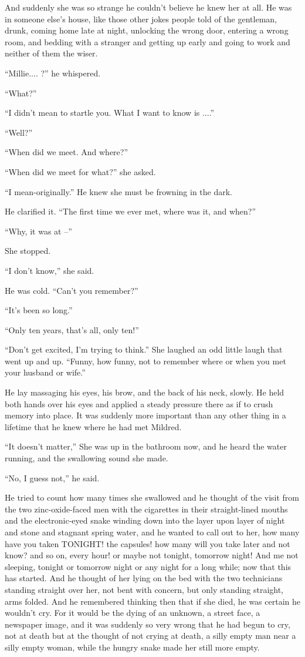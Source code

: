 \documentclass[11pt,openany]{book}
\begin{document}
And suddenly she was so strange he couldn't believe he knew her at all. He was in someone else's house, like those other jokes people told of the gentleman, drunk, coming home late at night, unlocking the wrong door, entering a wrong room, and bedding with a stranger and getting up early and going to work and neither of them the wiser.

``Millie.... ?'' he whispered.

``What?''

``I didn't mean to startle you. What I want to know is ....''

``Well?''

``When did we meet. And where?''

``When did we meet for what?'' she asked.

``I mean-originally.'' He knew she must be frowning in the dark.

He clarified it. ``The first time we ever met, where was it, and when?''

``Why, it was at --''

She stopped.

``I don't know,'' she said.

He was cold. ``Can't you remember?''

``It's been so long.''

``Only ten years, that's all, only ten!''

``Don't get excited, I'm trying to think.'' She laughed an odd little laugh that went up and up. ``Funny, how funny, not to remember where or when you met your husband or wife.''

He lay massaging his eyes, his brow, and the back of his neck, slowly. He held both hands over his eyes and applied a steady pressure there as if to crush memory into place. It was suddenly more important than any other thing in a lifetime that he knew where he had met Mildred.

``It doesn't matter,'' She was up in the bathroom now, and he heard the water running, and the swallowing sound she made.

``No, I guess not,'' he said.

He tried to count how many times she swallowed and he thought of the visit from the two zinc-oxide-faced men with the cigarettes in their straight-lined mouths and the electronic-eyed snake winding down into the layer upon layer of night and stone and stagnant spring water, and he wanted to call out to her, how many have you taken TONIGHT! the capsules! how many will you take later and not know? and so on, every hour! or maybe not tonight, tomorrow night! And me not sleeping, tonight or tomorrow night or any night for a long while; now that this has started. And he thought of her lying on the bed with the two technicians standing straight over her, not bent with concern, but only standing straight, arms folded. And he remembered thinking then that if she died, he was certain he wouldn't cry. For it would be the dying of an unknown, a street face, a newspaper image, and it was suddenly so very wrong that he had begun to cry, not at death but at the thought of not crying at death, a silly empty man near a silly empty woman, while the hungry snake made her still more empty.
\end{document}
